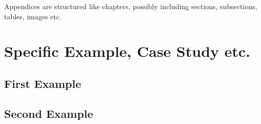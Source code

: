 \documentclass[thesis]{plai}
\begin{document}
Appendices are structured like chapters, possibly including sections, subsections, tables, images etc.

\chapter{Specific Example, Case Study etc.}

\section{First Example}
\lipsum[1]

\section{Second Example}
\lipsum[2]

\end{document}
